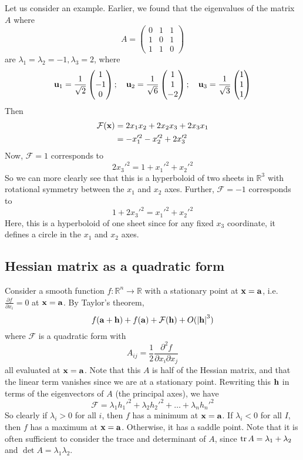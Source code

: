 Let us consider an example.
Earlier, we found that the eigenvalues of the matrix \(A\) where
\[
	A = \begin{pmatrix}
		0 & 1 & 1 \\ 1 & 0 & 1 \\ 1 & 1 & 0
	\end{pmatrix}
\]
are \(\lambda_1 = \lambda_2 = -1, \lambda_3 = 2\), where
\[
	\vb u_1 = \frac{1}{\sqrt 2} \begin{pmatrix}
		1 \\ -1 \\ 0
	\end{pmatrix};\quad \vb u_2 = \frac{1}{\sqrt 6}\begin{pmatrix}
		1 \\ 1 \\ -2
	\end{pmatrix};\quad \vb u_3 = \frac{1}{\sqrt 3}\begin{pmatrix}
		1 \\ 1 \\ 1
	\end{pmatrix}
\]
Then
\begin{align*}
	\mathcal F(\vb x) & = 2x_1x_2 + 2x_2x_3 + 2x_3x_1 \\
	                  & = -x_1'^2 -x_2'^2 + 2x_3'^2
\end{align*}
Now, \(\mathcal F = 1\) corresponds to
\[
	2x_3'^2 = 1 + x_1'^2 + x_2'^2
\]
So we can more clearly see that this is a hyperboloid of two sheets in \(\mathbb R^3\) with rotational symmetry between the \(x_1\) and \(x_2\) axes.
Further, \(\mathcal F = -1\) corresponds to
\[
	1 + 2x_3'^2 = x_1'^2 + x_2'^2
\]
Here, this is a hyperboloid of one sheet since for any fixed \(x_3\) coordinate, it defines a circle in the \(x_1\) and \(x_2\) axes.

\subsection{Hessian matrix as a quadratic form}
Consider a smooth function \(f\colon \mathbb R^n \to \mathbb R\) with a stationary point at \(\vb x = \vb a\), i.e.\ \(\frac{\partial f}{\partial x_i} = 0\) at \(\vb x = \vb a\).
By Taylor's theorem,
\[
	f(\vb a + \vb h) + f(\vb a) + \mathcal F(\vb h) + O(\abs{\vb h}^3)
\]
where \(\mathcal F\) is a quadratic form with
\[
	A_{ij} = \frac{1}{2}\frac{\partial^2 f}{\partial x_i\partial x_j}
\]
all evaluated at \(\vb x = \vb a\).
Note that this \(A\) is half of the Hessian matrix, and that the linear term vanishes since we are at a stationary point.
Rewriting this \(\vb h\) in terms of the eigenvectors of \(A\) (the principal axes), we have
\[
	\mathcal F = \lambda_1 h_1'^2 + \lambda_2 h_2'^2 + \dots + \lambda_n h_n'^2
\]
So clearly if \(\lambda_i > 0\) for all \(i\), then \(f\) has a minimum at \(\vb x = \vb a\).
If \(\lambda_i < 0\) for all \(I\), then \(f\) has a maximum at \(\vb x = \vb a\).
Otherwise, it has a saddle point.
Note that it is often sufficient to consider the trace and determinant of \(A\), since \(\trace A = \lambda_1 + \lambda_2\) and \(\det A = \lambda_1\lambda_2\).
